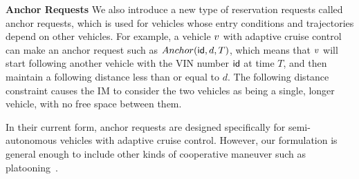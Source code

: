 \noindent
\textbf{Anchor Requests}
We also introduce a new type of reservation requests called anchor
requests, which is used for vehicles whose entry conditions and
trajectories depend on other vehicles.  For example, a vehicle $v$
with adaptive cruise control can make an anchor request such as
$Anchor(\textsf{id}, d, T)$, which means that $v$ will start following
another vehicle with the VIN number $\textsf{id}$ at time $T$, and then
maintain a following distance less than or equal to $d$.  The
following distance constraint causes the IM to consider the two
vehicles as being a single, longer vehicle, with no free space between
them.

In their current form, anchor requests are designed specifically for
semi-autonomous vehicles with adaptive cruise control. However, our
formulation is general enough to include other kinds of cooperative maneuver
such as platooning~\cite{bib:Sheikholeslam90Longitudinal}.










